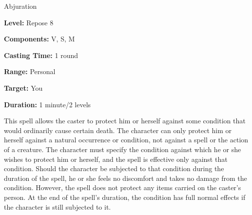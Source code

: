 
Abjuration

\textbf{Level:} Repose 8

\textbf{Components:} V, S, M

\textbf{Casting Time:} 1 round

\textbf{Range:} Personal

\textbf{Target:} You

\textbf{Duration:} 1 minute/2 levels

This spell allows the caster to protect him or herself against some condition that 
would ordinarily cause certain death. The character can only protect him or herself 
against a natural occurrence or condition, not against a spell or the action of 
a creature. The character must specify the condition against which he or she wishes 
to protect him or herself, and the spell is effective only against that condition. 
Should the character be subjected to that condition during the duration of the 
spell, he or she feels no discomfort and takes no damage from the condition. However, 
the spell does not protect any items carried on the caster's person. At the end 
of the spell's duration, the condition has full normal effects if the character 
is still subjected to it.
